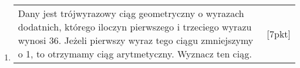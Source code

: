 \documentclass[12pt,a4paper]{article}
\begin{document}
\begin{enumerate}[1.]
	\item \begin{tabular}{p{13cm} r}
		Dany jest trójwyrazowy ciąg geometryczny o wyrazach dodatnich, którego iloczyn pierwszego i trzeciego wyrazu wynosi 36. Jeżeli pierwszy wyraz tego ciągu zmniejszymy o 1, to otrzymamy ciąg arytmetyczny. Wyznacz ten ciąg. &[7pkt]\\ 
	\end{tabular}
	
\end{enumerate}
	
\end{document}
